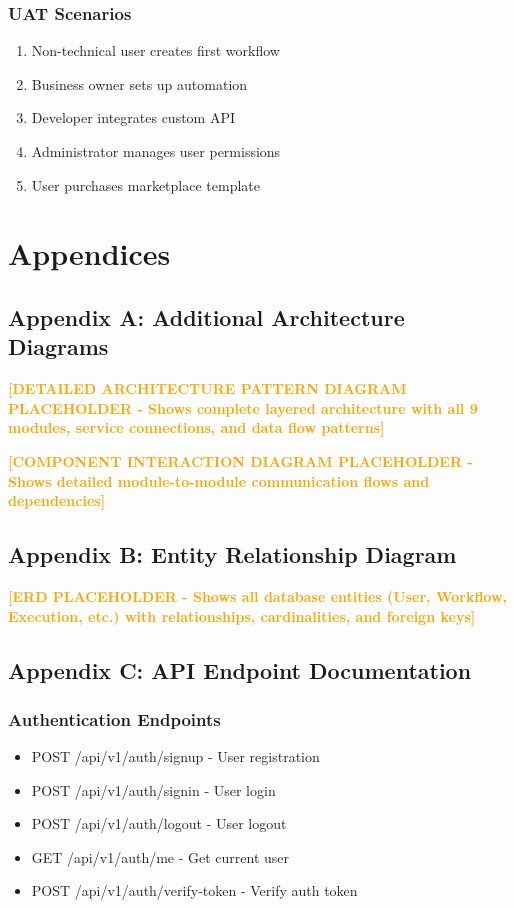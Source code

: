\documentclass[12pt,a4paper]{article}
\begin{document}
\subsubsection{UAT Scenarios}
\begin{enumerate}
    \item Non-technical user creates first workflow
    \item Business owner sets up automation
    \item Developer integrates custom API
    \item Administrator manages user permissions
    \item User purchases marketplace template
\end{enumerate}

\newpage

\section{Appendices}

\subsection{Appendix A: Additional Architecture Diagrams}

\textcolor{orange}{\textbf{[DETAILED ARCHITECTURE PATTERN DIAGRAM PLACEHOLDER - Shows complete layered architecture with all 9 modules, service connections, and data flow patterns]}}

\textcolor{orange}{\textbf{[COMPONENT INTERACTION DIAGRAM PLACEHOLDER - Shows detailed module-to-module communication flows and dependencies]}}

\subsection{Appendix B: Entity Relationship Diagram}

\textcolor{orange}{\textbf{[ERD PLACEHOLDER - Shows all database entities (User, Workflow, Execution, etc.) with relationships, cardinalities, and foreign keys]}}

\subsection{Appendix C: API Endpoint Documentation}

\subsubsection{Authentication Endpoints}
\begin{itemize}
    \item POST /api/v1/auth/signup - User registration
    \item POST /api/v1/auth/signin - User login
    \item POST /api/v1/auth/logout - User logout
    \item GET /api/v1/auth/me - Get current user
    \item POST /api/v1/auth/verify-token - Verify auth token
\end{itemize}
\end{document}
